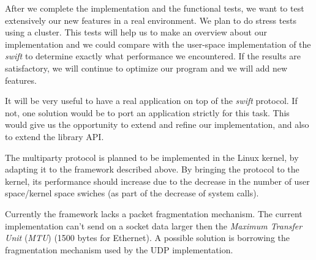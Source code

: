 After we complete the implementation and the functional tests, we want to test
extensively our new features in a real environment. We plan to do stress tests
using a cluster. This tests will help us to make an overview about our
implementation and we could compare with the user-space implementation of the
\textit{swift} to determine exactly what performance we encountered. If the
results are satisfactory, we will continue to optimize our program and we will
add new features.

It will be very useful to have a real application on top of the \textit{swift}
protocol. If not, one solution would be to port an application strictly for
this task. This would give us the opportunity to extend and refine our
implementation, and also to extend the library API.

The multiparty protocol is planned to be implemented in the Linux kernel, by
adapting it to the framework described above. By bringing the protocol to the
kernel, its performance should increase due to the decrease in the number of
user space/kernel space swiches (as part of the decrease of system calls).

Currently the framework lacks a packet fragmentation mechanism. The current
implementation can't send on a socket data larger then the \textit{Maximum
Transfer Unit} (\textit{MTU}) (1500 bytes for Ethernet). A possible solution
is borrowing the fragmentation mechanism used by the UDP implementation.
